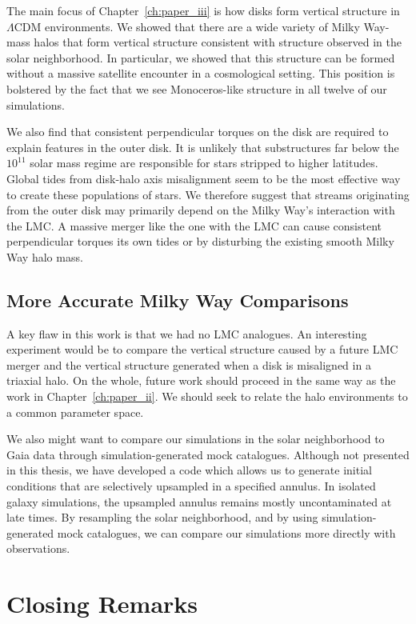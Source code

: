 The main focus of Chapter~\ref{ch:paper_iii} is how disks form vertical structure in $\Lambda$CDM environments. We showed that there are a wide variety of Milky Way-mass halos that form vertical structure consistent with structure observed in the solar neighborhood. In particular, we showed that this structure can be formed without a massive satellite encounter in a cosmological setting. This position is bolstered by the fact that we see Monoceros-like structure in all twelve of our simulations.

We also find that consistent perpendicular torques on the disk are required to explain features in the outer disk. It is unlikely that substructures far below the $10^{11}$ solar mass regime are responsible for stars stripped to higher latitudes. Global tides from disk-halo axis misalignment seem to be the most effective way to create these populations of stars. We therefore suggest that streams originating from the outer disk may primarily depend on the Milky Way's interaction with the LMC. A massive merger like the one with the LMC can cause consistent perpendicular torques its own tides or by disturbing the existing smooth Milky Way halo mass. 

\subsection{More Accurate Milky Way Comparisons}

A key flaw in this work is that we had no LMC analogues. An interesting experiment would be to compare the vertical structure caused by a future LMC merger and the vertical structure generated when a disk is misaligned in a triaxial halo. On the whole, future work should proceed in the same way as the work in Chapter~\ref{ch:paper_ii}. We should seek to relate the halo environments to a common parameter space.

We also might want to compare our simulations in the solar neighborhood to Gaia data through simulation-generated mock catalogues. Although not presented in this thesis, we have developed a code which allows us to generate initial conditions that are selectively upsampled in a specified annulus. In isolated galaxy simulations, the upsampled annulus remains mostly uncontaminated at late times. By resampling the solar neighborhood, and by using simulation-generated mock catalogues, we can compare our simulations more directly with observations.

\section{Closing Remarks}

